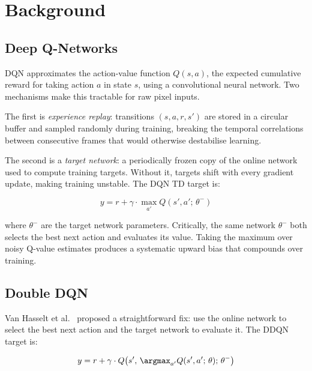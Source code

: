 \documentclass[a4paper]{article}
\begin{document}
\section{Background}
\label{sec:background}

\subsection{Deep Q-Networks}

DQN \cite{mnih2015human} approximates the action-value function $Q(s, a)$, the expected cumulative reward for taking action $a$ in state $s$, using a convolutional neural network. Two mechanisms make this tractable for raw pixel inputs.

The first is \textit{experience replay}: transitions $(s, a, r, s')$ are stored in a circular buffer and sampled randomly during training, breaking the temporal correlations between consecutive frames that would otherwise destabilise learning.

The second is a \textit{target network}: a periodically frozen copy of the online network used to compute training targets. Without it, targets shift with every gradient update, making training unstable. The DQN TD target is:

\begin{equation}
    y = r + \gamma \cdot \max_{a'} Q(s', a';\, \theta^{-})
\end{equation}

where $\theta^{-}$ are the target network parameters. Critically, the same network $\theta^{-}$ both selects the best next action and evaluates its value. Taking the maximum over noisy Q-value estimates produces a systematic upward bias that compounds over training.

\subsection{Double DQN}

Van Hasselt et al.\ \cite{van2016deep} proposed a straightforward fix: use the online network to select the best next action and the target network to evaluate it. The DDQN target is:

\begin{equation}
    y = r + \gamma \cdot Q\!\left(s',\, \argmax_{a'} Q(s', a';\, \theta);\, \theta^{-}\right)
\end{equation}
\end{document}
